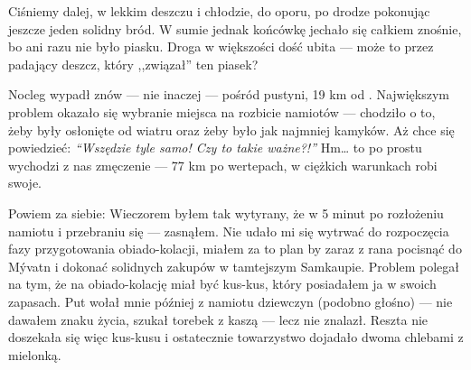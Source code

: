 Ciśniemy dalej, w lekkim deszczu i chłodzie, do oporu, po drodze pokonując jeszcze jeden solidny bród. W sumie jednak końcówkę jechało się całkiem znośnie, bo ani razu nie było piasku. Droga w większości dość ubita --- może to przez padający deszcz, który ,,związał'' ten piasek?


Nocleg wypadł znów --- nie inaczej --- pośród pustyni, 19 km od . Największym problem okazało się wybranie miejsca na rozbicie namiotów --- chodziło o to, żeby były osłonięte od wiatru oraz żeby było jak najmniej kamyków. Aż chce się powiedzieć: \emph{“Wszędzie tyle samo! Czy to takie ważne?!”} Hm… to po prostu wychodzi z nas zmęczenie --- 77 km po wertepach, w ciężkich warunkach robi swoje.

Powiem za siebie: Wieczorem byłem tak wytyrany, że w 5 minut po rozłożeniu namiotu i przebraniu się --- zasnąłem. Nie udało mi się wytrwać do rozpoczęcia fazy przygotowania obiado-kolacji, miałem za to plan by zaraz z rana pocisnąć do Mývatn i dokonać solidnych zakupów w tamtejszym Samkaupie. Problem polegał na tym, że na obiado-kolację miał być kus-kus, który posiadałem ja w swoich zapasach. Put wołał mnie później z namiotu dziewczyn (podobno głośno) --- nie dawałem znaku życia, szukał torebek z kaszą --- lecz nie znalazł. Reszta nie doszekała się więc kus-kusu i ostatecznie towarzystwo dojadało dwoma chlebami z mielonką.
